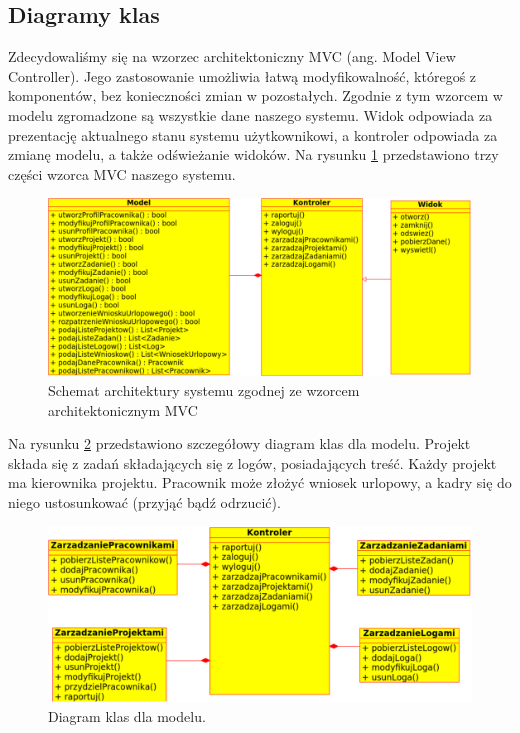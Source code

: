 \subsection{Diagramy klas}

Zdecydowaliśmy się na wzorzec architektoniczny MVC (ang. Model View Controller). 
Jego zastosowanie umożliwia łatwą modyfikowalność, któregoś z komponentów, bez                                                                                               
konieczności zmian w pozostałych. Zgodnie z tym wzorcem w modelu zgromadzone są wszystkie dane naszego systemu. 
Widok odpowiada za prezentację aktualnego stanu systemu użytkownikowi, a kontroler odpowiada za zmianę modelu, a także odświeżanie widoków.
Na rysunku \ref{fig:mvc} przedstawiono trzy części wzorca MVC naszego systemu.

\begin{figure}[h]
    \centering
    \includegraphics[scale=0.5]{diagramy/modelKlas/mvc.pdf}
    \caption{Schemat architektury systemu zgodnej ze wzorcem architektonicznym MVC}
    \label{fig:mvc}
\end{figure}

Na rysunku \ref{fig:ModelDiagramKlas} przedstawiono szczegółowy diagram klas dla modelu. Projekt składa się z zadań składających się z logów, posiadających
treść. Każdy projekt ma kierownika projektu. Pracownik może złożyć wniosek urlopowy, a kadry się do niego ustosunkować (przyjąć bądź odrzucić).

\begin{figure}[h]
    \centering
    \includegraphics[scale=0.5]{diagramy/modelKlas/ModelDiagramKlas}
    \caption{Diagram klas dla modelu.}
    \label{fig:ModelDiagramKlas}
\end{figure}

